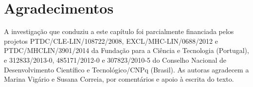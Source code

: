 \documentclass[output=paper]{LSP/langsci}
\begin{document}
\section*{Agradecimentos}
A investigação que conduziu a este capítulo foi parcialmente financiada pelos projetos PTDC/CLE-LIN/108722/2008, EXCL/MHC-LIN/0688/2012 e PTDC/MHCLIN/3901/2014 da Fundação para a Ciência e Tecnologia (Portugal), e 312833/2013-0, 485171/2012-0 e 307823/2010-5 do Conselho Nacional de Desenvolvimento Científico e Tecnológico/CNPq (Brasil). As autoras agradecem a Marina Vigário e Susana Correia, por comentários e apoio à escrita do texto.


{\sloppy
\printbibliography[heading=subbibliography,notkeyword=this]
}
\end{document}

